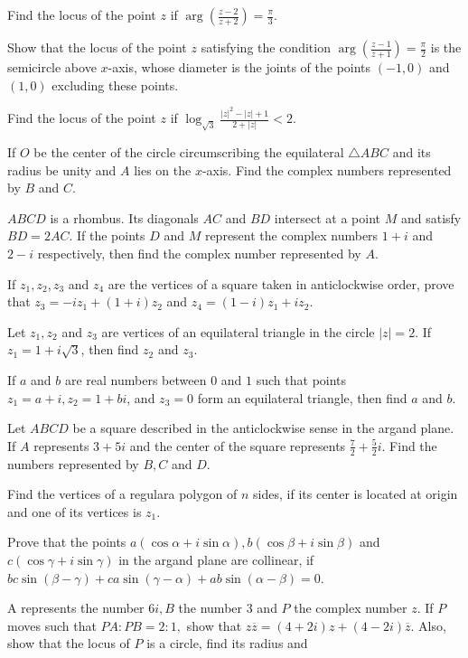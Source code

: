 \item Find the locus of the point $z$ if $\arg\left(\frac{z - 2}{z + 2}\right) = \frac{\pi}{3}$.
\item Show that the locus of the point $z$ satisfying the condition $\arg\left(\frac{z - 1}{z + 1}\right) = \frac{\pi}{2}$ is the
  semicircle above $x$-axis, whose diameter is the joints of the points $(-1, 0)$ and $(1, 0)$ excluding these points.
\item Find the locus of the point $z$ if $\log_{\sqrt{3}}\frac{|z|^2 - |z| + 1}{2 + |z|} < 2$.
\item If $O$ be the center of the circle circumscribing the equilateral $\triangle ABC$ and its radius be unity and $A$ lies on the
  $x$-axis. Find the complex numbers represented by $B$ and $C$.
\item $ABCD$ is a rhombus. Its diagonals $AC$ and $BD$ intersect at a point $M$ and satisfy $BD = 2AC$. If the points $D$ and $M$
  represent the complex numbers $1 + i$ and $2 - i$ respectively, then find the complex number represented by $A$.
\item If $z_1, z_2 , z_3$ and $z_4$ are the vertices of a square taken in anticlockwise order, prove that $z_3 = -iz_1 + (1 +
  i)z_2$ and $z_4 = (1 - i)z_1 + iz_2$.
\item Let $z_1, z_2$ and $z_3$ are vertices of an equilateral triangle in the circle $|z| = 2$. If $z_1 = 1 + i\sqrt{3}$, then find
  $z_2$ and $z_3$.
\item If $a$ and $b$ are real numbers between $0$ and $1$ such that points $z_1 = a + i, z_2 = 1 + bi$, and $z_3 = 0$ form an
  equilateral triangle, then find $a$ and $b$.
\item Let $ABCD$ be a square described in the anticlockwise sense in the argand plane. If $A$ represents $3 + 5i$ and the center of
  the square represents $\frac{7}{2} + \frac{5}{2}i$. Find the numbers represented by $B, C$ and $D$.
\item Find the vertices of a regulara polygon of $n$ sides, if its center is located at origin and one of its vertices is $z_1$.
\item Prove that the points $a(\cos\alpha + i\sin\alpha), b(\cos\beta + i\sin\beta)$ and $c(\cos\gamma + i\sin\gamma)$ in the argand
  plane are collinear, if $bc\sin(\beta - \gamma) + ca\sin(\gamma - \alpha) + ab\sin(\alpha - \beta) = 0$.
\item A represents the number $6i, B$ the number $3$ and $P$ the complex number $z$. If $P$ moves such that $PA:PB = 2:1,$ show
  that $z\overline{z} = (4 + 2i)z + (4 - 2i)\overline{z}$. Also, show that the locus of $P$ is a circle, find its radius and
